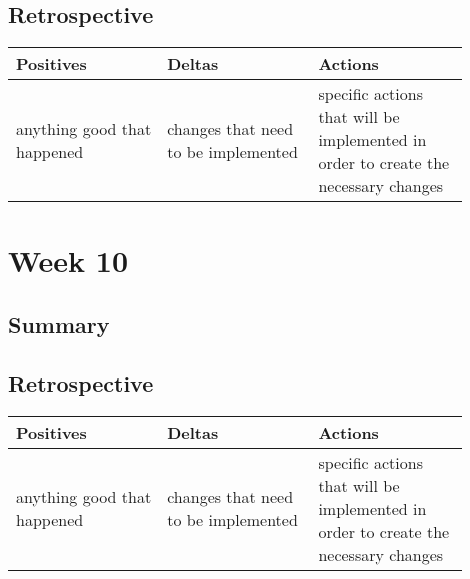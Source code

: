 \documentclass[letterpaper,10pt,serif,draftclsnofoot,onecolumn,compsoc,titlepage]{IEEEtran}
\begin{document}
\subsection{Retrospective}


\begin{tabular}{|p{0.3\linewidth}|p{0.3\linewidth}|p{0.3\linewidth}|}
   \hline
   \textbf{Positives} & \textbf{Deltas} & \textbf{Actions}\\ 
   \hline
   anything good that happened & changes that need to be implemented & specific actions that will be implemented in order to create the necessary changes \\
   \hline
\end{tabular}

\section{Week 10}

\subsection{Summary}


\subsection{Retrospective}


\begin{tabular}{|p{0.3\linewidth}|p{0.3\linewidth}|p{0.3\linewidth}|}
   \hline
   \textbf{Positives} & \textbf{Deltas} & \textbf{Actions}\\ 
   \hline
   anything good that happened & changes that need to be implemented & specific actions that will be implemented in order to create the necessary changes \\
   \hline
\end{tabular}





\nocite{*}
\end{document}
